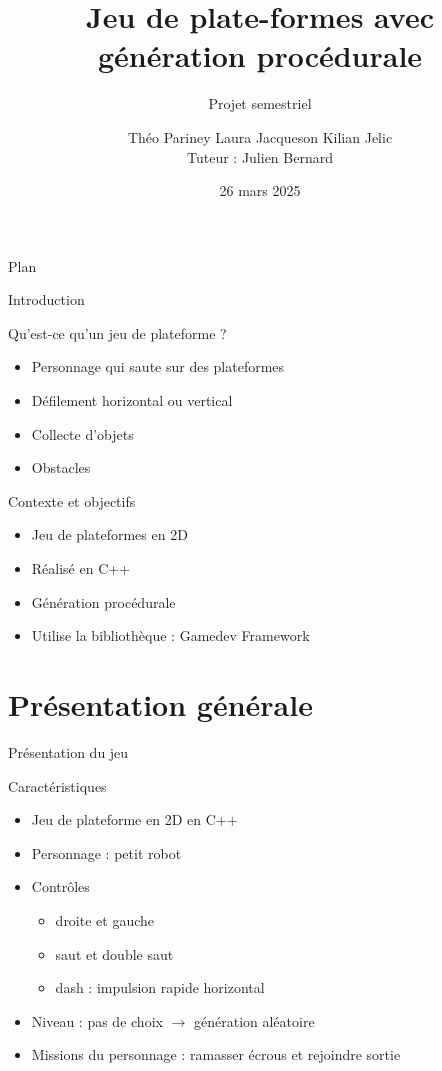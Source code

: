 \documentclass{beamer}
\title{Jeu de plate-formes avec génération procédurale}
\subtitle{Projet semestriel}
\author[T.Pariney L.Jaqueson K.Jelic]{Théo Pariney \newline Laura Jacqueson \newline Kilian Jelic\\\footnotesize Tuteur : Julien Bernard}
\institute[]{Université Marie et Louis Pasteur \\ \vspace{0.25cm} Licence 3 Informatique, 2024--2025}
\date{26 mars 2025}
\newcommand{\nologo}{\setbeamertemplate{logo}{}}
\begin{document}
\begin{frame}
    \titlepage
\end{frame}

{\nologo

\begin{frame}{Plan}
    \tableofcontents
\end{frame}

\begin{frame}{Introduction}
    \begin{block}{Qu'est-ce qu'un jeu de plateforme ?}
       \begin{itemize}
            \item[\bullet] Personnage qui saute sur des plateformes
            \item[\bullet] Défilement horizontal ou vertical
            \item[\bullet] Collecte d'objets
            \item[\bullet] Obstacles
        \end{itemize}
    \end{block}
    \begin{block}{Contexte et objectifs}
        \begin{itemize}
            \item[\bullet] Jeu de plateformes en 2D
            \item[\bullet] Réalisé en C++
            \item[\bullet] Génération procédurale
            \item[\bullet] Utilise la bibliothèque : Gamedev Framework
        \end{itemize}
    \end{block}
\end{frame}

\section{Présentation générale}
\begin{frame}{Présentation du jeu}
    \begin{block}{Caract\'eristiques}
        \begin{itemize}
            \item[\bullet] Jeu de plateforme en 2D en C++
            \item[\bullet] Personnage : petit robot
            \item[\bullet] Contrôles
            \begin{itemize}
                \item droite et gauche
                \item saut et double saut
                \item dash : impulsion rapide horizontal
            \end{itemize}
            \item[\bullet] Niveau : pas de choix $\rightarrow$ génération aléatoire
            \item[\bullet] Missions du personnage : ramasser écrous et rejoindre sortie
        \end{itemize}
    \end{block}
\end{frame}

}
\end{document}

